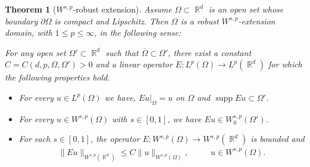 \documentclass[12pt, reqno]{amsart}%
\theoremstyle{plain}  %
\newtheorem{theorem}{Theorem}[section]
\theoremstyle{definition}  %
\theoremstyle{remark}
\numberwithin{equation}{section}
\DeclareMathOperator{\supp}{supp}
\DeclareMathOperator{\R}{\mathbb{R}}
\begin{document}
\begin{theorem}[$W^{s,p}$-robust extension]\label{thm:robust-extension}
Assume $\Omega \subset \R^d$ is an open set whose boundary $\partial\Omega$
 is compact and Lipschitz. Then $\Omega$ is a robust  $W^{s,p}$-\emph{extension domain}, with $1\leq p \leq \infty$, in the following sense:

\smallskip
 \noindent For any open set $\Omega'\subset \R^d$  such that $\overline{\Omega}\subset \Omega'$, there exist a constant $C=C(d,p,\Omega, \Omega')>0$ and a linear operator $E: L^p(\Omega)\to L^p(\R^d) $
for which  the following properties hold.
\begin{itemize}
\item For every $u\in L^p(\Omega)$ we have, $Eu|_\Omega=u$  on $\Omega$ and $\supp Eu\subset \Omega'$.
\item  For  every $u\in W^{s,p}(\Omega)$ with $s\in [0,1]$,  we have $Eu\in W^{s,p}_0 (\Omega')$.
\item
For  each $s\in [0,1]$, the operator $E:  W^{s,p}(\Omega)\to  W^{s,p}(\R^d)$ is  bounded  and
\begin{align*}
\|Eu \|_{W^{s,p}(\R^d)}
\leq C\|u\|_{W^{s,p}(\Omega)},
\qquad\text{ $u\in W^{s,p}(\Omega)$}.
\end{align*}
\end{itemize}
\end{theorem}
\smallskip
\end{document}
